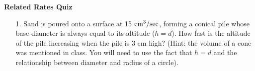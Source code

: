 \documentclass[11pt]{article}
\begin{document}

\centerline{\textbf{\Large{Related Rates Quiz}}}

\vspace{0.2in}
 

\begin{enumerate}

\item[1.] Sand is poured onto a surface at 15 $\textnormal{cm}^3 / \textnormal{sec}$, forming a conical pile whose base diameter is always equal to its altitude ($h = d$). How fast is the altitude of the pile increasing when the pile is 3 cm high? (Hint: the volume of a cone was mentioned in class. You will need to use the fact that $h = d$ and the relationship between diameter and radius of a circle). 
	
\end{enumerate}
 
\end{document}

